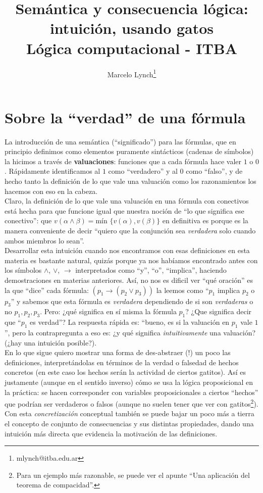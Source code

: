 \documentclass[10pt,a4paper]{article}
\title{Semántica y consecuencia lógica: intuición, usando gatos \\
\large Lógica computacional - ITBA
}
\author{Marcelo Lynch\footnote{mlynch@itba.edu.ar}}
\date{}
\newcommand{\ra}{\rightarrow}
\renewcommand{\a}{\alpha}
\renewcommand{\b}{\beta}
\begin{document}
\maketitle

\section*{Sobre la ``verdad'' de una fórmula}
La introducción de una semántica (``significado'') para las fórmulas, que en principio definimos como elementos puramente sintácticos (cadenas de símbolos) la hicimos a través de \textbf{valuaciones}: funciones que a cada fórmula hace valer $1$ o $0$. Rápidamente identificamos al $1$ como ``verdadero'' y al $0$ como ``falso'', y de hecho tanto la definición de lo que vale una valuación como los razonamientos los hacemos con eso en la cabeza.\\

Claro, la definición de lo que vale una valuación en una fórmula con conectivos está hecha para que funcione igual que nuestra noción de ``lo que significa ese conectivo'': que $v(\a \land \b) = \text{mín \{} v(\a), v(\b) \}$ en definitiva es porque es la manera conveniente de decir ``quiero que la conjunción sea \textit{verdadera} solo cuando ambos miembros lo sean''. \\
 
Desarrollar esta intuición cuando nos encontramos con esas definiciones en esta materia es bastante natural, quizás porque ya nos habíamos encontrado antes con los símbolos $\land$, $\vee$, $\ra$ interpretados como ``y'', ``o'', ``implica'', haciendo demostraciones en materias anteriores. Así, no nos es dificil ver ``qué oración'' es la que ``dice'' cada fórmula: $(p_1 \ra (p_2 \vee p_3))$ la leemos como ``$p_1$ implica $p_2$ o $p_3$'' y sabemos que esta fórmula es \textit{verdadera} dependiendo de si son \textit{verdaderas} o no $p_1, p_2, p_3$. Pero: ¿qué significa en sí misma la fórmula $p_1$? ¿Que significa decir que ``$p_1$ es verdad''? La respuesta rápida es: ``bueno, es si la valuación en $p_1$ vale $1$'', pero la contrapregunta a eso es: ¿y qué significa \textit{intuitivamente} una valuación? (¿hay una intuición posible?). \\

En lo que sigue quiero mostrar una forma de des-abstraer (!) un poco las definiciones, interpretándolas en términos de la verdad o falsedad de hechos concretos (en este caso los hechos serán la actividad de ciertos gatitos). Así es justamente (aunque en el sentido inverso) cómo se usa la lógica proposicional en la práctica: se hacen corresponder con variables proposicionales a ciertos ``hechos'' que podrían ser verdaderos o falsos (aunque no suelen tener que ver con gatitos\footnote{Para un ejemplo más razonable, se puede ver el apunte ``Una aplicación del teorema de compacidad''.}). Con esta \textit{concretización} conceptual también se puede bajar un poco más a tierra el concepto de conjunto de consecuencias y sus distintas propiedades, dando una intuición más directa que evidencia la motivación de las definiciones.
\end{document}
